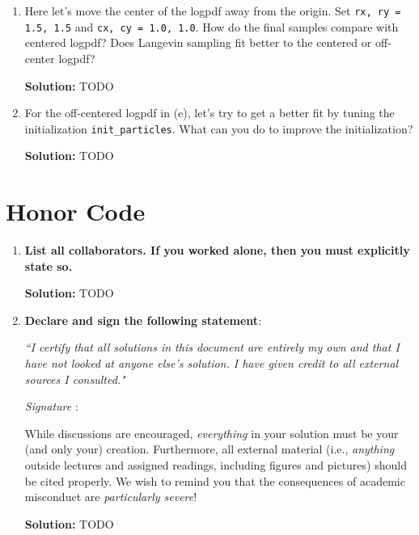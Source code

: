 \documentclass{article}
\newcommand{\Question}[1]{\Large \section{ #1 } \normalsize}
\newenvironment{solution}{\color{blue} \smallskip \textbf{Solution:}}{}
\begin{document}
\begin{enumerate}
    \begin{solution}
        TODO
    \end{solution}

    \item 
    Here let's move the center of the logpdf away from the origin. 
    Set \texttt{rx, ry = 1.5, 1.5} and \texttt{cx, cy = 1.0, 1.0}. 
    How do the final samples compare with centered logpdf? 
    Does Langevin sampling fit better to the centered or off-center logpdf?

    \begin{solution}
        TODO
    \end{solution}

    \item 
    For the off-centered logpdf in (e), let's try to get a better fit by tuning the initialization
    \texttt{init\_particles}. What can you do to improve the initialization?

    \begin{solution}
        TODO
    \end{solution}
\end{enumerate}

\Question{Honor Code}
\begin{enumerate}
    \item 
    \textbf{List all collaborators. If you worked alone, then you must explicitly state so.}

    \begin{solution}
        TODO
    \end{solution}

    \item
    \textbf{Declare and sign the following statement}: 
    
    \textit{``I certify that all solutions in this document are entirely my own and that I have not looked at anyone else's solution. I have given credit to all external sources I consulted."}
    
    \textit{Signature} : \hrulefill
    
    While discussions are encouraged, \emph{everything} in your solution must be your (and only your) creation. 
    Furthermore, all external material  (i.e., \emph{anything} outside lectures and assigned
    readings, including figures and pictures) should be cited properly.
    We wish to remind you that the consequences of academic misconduct are \emph{particularly severe}!

    \begin{solution}
        TODO
    \end{solution}

\end{enumerate}
\end{document}
